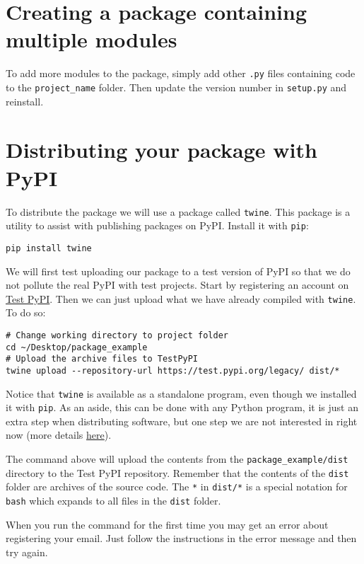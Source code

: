 \documentclass[12pt, a4paper]{article}
\begin{document}
\section*{Creating a package containing multiple modules}
\label{sec:orge77ca03}
To add more modules to the package, simply add other \texttt{.py} files containing code to the \texttt{project\_name} folder. Then update the version number in \texttt{setup.py} and reinstall.
\section*{Distributing your package with PyPI}
\label{sec:org2fdbe33}
To distribute the package we will use a package called \texttt{twine}.
This package is a utility to assist with publishing packages on PyPI.
Install it with \texttt{pip}:
\lstset{language=bash,label= ,caption= ,captionpos=b,numbers=none}
\begin{lstlisting}
pip install twine
\end{lstlisting}
We will first test uploading our package to a test version of PyPI so that we do not pollute the real PyPI with test projects.
Start by registering an account on \href{https://test.pypi.org/account/register/}{Test PyPI}.
Then we can just upload what we have already compiled with \texttt{twine}.
To do so:
\lstset{language=bash,label= ,caption= ,captionpos=b,numbers=none}
\begin{lstlisting}
# Change working directory to project folder
cd ~/Desktop/package_example
# Upload the archive files to TestPyPI
twine upload --repository-url https://test.pypi.org/legacy/ dist/*
\end{lstlisting}
Notice that \texttt{twine} is available as a standalone program, even though we installed it with \texttt{pip}.
As an aside, this can be done with any Python program, it is just an extra step when distributing software, but one step we are not interested in right now (more details \href{https://docs.python-guide.org/shipping/freezing/}{here}).

The command above will upload the contents from the \texttt{package\_example/dist} directory to the Test PyPI repository. Remember that the contents of the \texttt{dist} folder are archives of the source code.
The \texttt{*} in \texttt{dist/*} is a special notation for \texttt{bash} which expands to all files in the \texttt{dist} folder.

When you run the command for the first time you may get an error about registering your email. Just follow the instructions in the error message and then try again.
\end{document}
